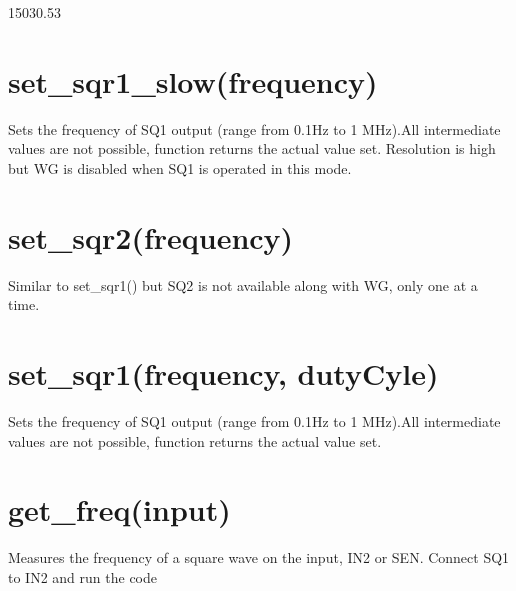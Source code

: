 \documentclass[a4paper,12pt,english]{sphinxmanual}
\begin{document}
\begin{sphinxVerbatim}[commandchars=\\\{\}]
 
\end{sphinxVerbatim}

15030.53


\section{set\_sqr1\_slow(frequency)}
\label{\detokenize{7.1:set-sqr1-slow-frequency}}
Sets the frequency of SQ1 output (range from 0.1Hz to 1 MHz).All
intermediate values are not possible, function returns the actual value
set. Resolution is high but WG is disabled when SQ1 is operated in this
mode.

\begin{sphinxVerbatim}[commandchars=\\\{\}]
 
\end{sphinxVerbatim}


\section{set\_sqr2(frequency)}
\label{\detokenize{7.1:set-sqr2-frequency}}
Similar to set\_sqr1() but SQ2 is not available along with WG, only one
at a time.


\section{set\_sqr1(frequency, dutyCyle)}
\label{\detokenize{7.1:set-sqr1-frequency-dutycyle}}
Sets the frequency of SQ1 output (range from 0.1Hz to 1 MHz).All
intermediate values are not possible, function returns the actual value
set.

\begin{sphinxVerbatim}[commandchars=\\\{\}]
            
\end{sphinxVerbatim}


\section{get\_freq(input)}
\label{\detokenize{7.1:get-freq-input}}
Measures the frequency of a square wave on the input, IN2 or SEN.
Connect SQ1 to IN2 and run the code
\end{document}
